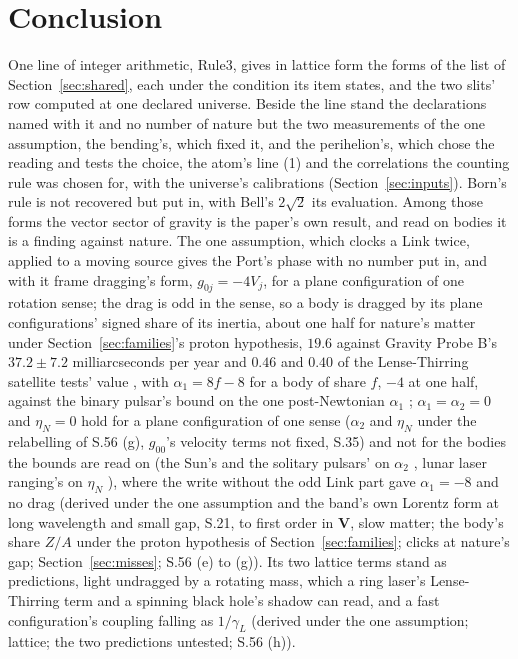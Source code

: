 \documentclass[pdflatex,sn-mathphys-num]{sn-jnl}
\theoremstyle{thmstyleone}
\theoremstyle{thmstyletwo}
\begin{document}
\section{Conclusion}\label{sec:conclusion}

One line of integer arithmetic, Rule3, gives in lattice form the forms of the list of Section~\ref{sec:shared}, each under the condition its item states, and the two slits' row computed at one declared universe. Beside the line stand the declarations named with it and no number of nature but the two measurements of the one assumption, the bending's, which fixed it, and the perihelion's, which chose the reading and tests the choice, the atom's line (1) and the correlations the counting rule was chosen for, with the universe's calibrations (Section~\ref{sec:inputs}). Born's rule is not recovered but put in, with Bell's $2\sqrt 2$ its evaluation. Among those forms the vector sector of gravity is the paper's own result, and read on bodies it is a finding against nature. The one assumption, which clocks a Link twice, applied to a moving source gives the Port's phase with no number put in, and with it frame dragging's form, $g_{0j} = -4V_j$, for a plane configuration of one rotation sense; the drag is odd in the sense, so a body is dragged by its plane configurations' signed share of its inertia, about one half for nature's matter under Section~\ref{sec:families}'s proton hypothesis, $19.6$ against Gravity Probe B's $37.2 \pm 7.2$ milliarcseconds per year \cite{everitt} and $0.46$ and $0.40$ of the Lense-Thirring satellite tests' value \cite{ciufolini, ciufolini2019}, with $\alpha_1 = 8f - 8$ for a body of share $f$, $-4$ at one half, against the binary pulsar's bound on the one post-Newtonian $\alpha_1$ \cite{shao}; $\alpha_1 = \alpha_2 = 0$ and $\eta_N = 0$ hold for a plane configuration of one sense ($\alpha_2$ and $\eta_N$ under the relabelling of S.56 (g), $g_{00}$'s velocity terms not fixed, S.35) and not for the bodies the bounds are read on (the Sun's and the solitary pulsars' on $\alpha_2$ \cite{nordtvedt}\cite{shao2013}, lunar laser ranging's on $\eta_N$ \cite{will}), where the write without the odd Link part gave $\alpha_1 = -8$ and no drag (derived under the one assumption and the band's own Lorentz form at long wavelength and small gap, S.21, to first order in $\mathbf V$, slow matter; the body's share $Z / A$ under the proton hypothesis of Section~\ref{sec:families}; clicks at nature's gap; Section~\ref{sec:misses}; S.56 (e) to (g)). Its two lattice terms stand as predictions, light undragged by a rotating mass, which a ring laser's Lense-Thirring term \cite{ginger} and a spinning black hole's shadow \cite{eht_sgra} can read, and a fast configuration's coupling falling as $1 / \gamma_L$ (derived under the one assumption; lattice; the two predictions untested; S.56 (h)).
\end{document}

